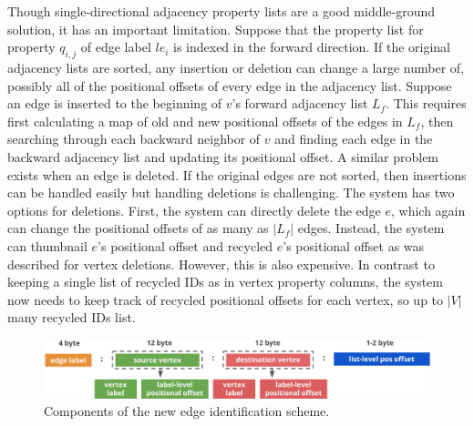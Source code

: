  Though single-directional adjacency property lists are a good middle-ground solution, it has an important limitation. Suppose that the property list for property $q_{i,j}$ of edge label $le_i$ is indexed in the forward direction. If the original adjacency lists are sorted,  any insertion or deletion can change a large number of, possibly all of the positional offsets of every edge in the adjacency list. Suppose an edge is inserted to the beginning of $v$'s forward adjacency list $L_f$. This requires first calculating a map of old and new positional offsets of the edges in $L_f$, then searching through each backward neighbor of $v$ and finding each edge in the backward adjacency list and updating its positional offset. A similar problem exists when an edge is deleted. If the original edges are not sorted, then insertions can be handled easily but handling deletions is challenging. The system has two options for deletions. First, the system can directly delete the edge $e$, which again can change the positional offsets of as many as $|L_f|$ edges. Instead, the system can thumbnail $e$'s positional offset and recycled $e$'s positional offset as was described for vertex deletions. However, this is also expensive. In contrast to keeping a single list of recycled IDs as in vertex property columns, the system now needs to keep track of recycled positional offsets for each vertex, so up to $|V|$ many recycled IDs list.

\begin{figure}
	\hfill\includegraphics[scale=0.78]{img/edge-scheme}\hspace*{\fill}
	\captionsetup{justification=centering}
	\caption{Components of the new edge identification scheme.}
	\label{fig:edge-scheme}
\end{figure}

